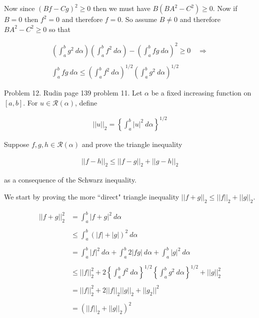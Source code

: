 \documentclass{article}
\begin{document}
  Now since $(Bf-Cg)^2\geq 0$ then we must have $B(BA^2-C^2)\geq 0$.  Now if $B=0$ then $f^2=0$ and therefore $f=0$.  So assume $B\ne 0$ and therefore $BA^2 - C^2 \geq 0$ so that

  \begin{align*}
    \left(\int_a^b g^2 \ d\alpha\right) \left(\int_a^bf^2 \ d\alpha\right)-\left(\int_a^b fg \ d\alpha\right)^2 \geq 0 \quad \Rightarrow \\\\
    \int_a^b fg\ d\alpha \leq \left(\int_a^b f^2\ d\alpha\right)^{1/2}\left(\int_a^b g^2\ d\alpha\right)^{1/2}
  \end{align*}

  \pagebreak
  {\Large \color{Sepia} Problem 12. Rudin page 139 problem 11. Let $\alpha$ be a fixed increasing function on $[a,b]$.  For $u\in\mathscr R(\alpha)$, define

  \begin{align*}
    ||u||_2 = \left\{\int_a^b |u|^2\ d\alpha\right\}^{1/2}
  \end{align*}

  Suppose $f,g,h\in\mathscr R(\alpha)$ and prove the triangle inequality

  \begin{align*}
    ||f-h||_2\leq ||f-g||_2+||g-h||_2
  \end{align*}

  as a consequence of the Schwarz inequality.

  }

  \vspace{1cm}

  We start by proving the more ``direct" triangle inequality $||f+g||_2\leq ||f||_2+||g||_2$.

  \begin{align*}
    ||f+g||_2^2 &= \int_a^b |f+g|^2 \ d\alpha \\\\
    &\leq \int_a^b (|f|+|g|)^2\ d\alpha \\\\
    &= \int_a^b |f|^2\ d\alpha + \int_a^b 2|fg|\ d\alpha + \int_a^b |g|^2\ d\alpha \\\\
    &\leq ||f||_2^2+2\left\{\int_a^b f^2 \ d\alpha\right\}^{1/2}\left\{\int_a^b g^2 \ d\alpha\right\}^{1/2}+||g||_2^2 \\\\
    &= ||f||_2^2 + 2||f||_2||g||_2 + ||g_2||^2 \\\\
    &= (||f||_2+||g||_2)^2
  \end{align*}
\end{document}
